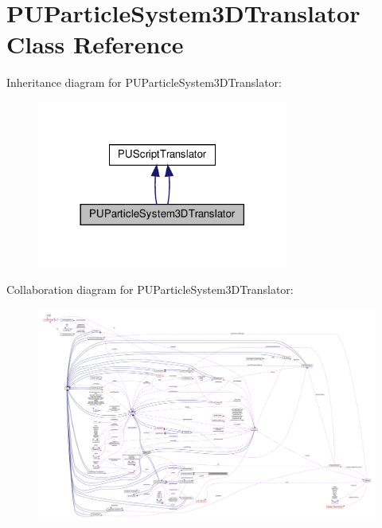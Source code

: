 \hypertarget{classPUParticleSystem3DTranslator}{}\section{P\+U\+Particle\+System3\+D\+Translator Class Reference}
\label{classPUParticleSystem3DTranslator}


Inheritance diagram for P\+U\+Particle\+System3\+D\+Translator\+:
\nopagebreak
\begin{figure}[H]
\begin{center}
\leavevmode
\includegraphics[width=234pt]{classPUParticleSystem3DTranslator__inherit__graph}
\end{center}
\end{figure}


Collaboration diagram for P\+U\+Particle\+System3\+D\+Translator\+:
\nopagebreak
\begin{figure}[H]
\begin{center}
\leavevmode
\includegraphics[width=350pt]{classPUParticleSystem3DTranslator__coll__graph}
\end{center}
\end{figure}
